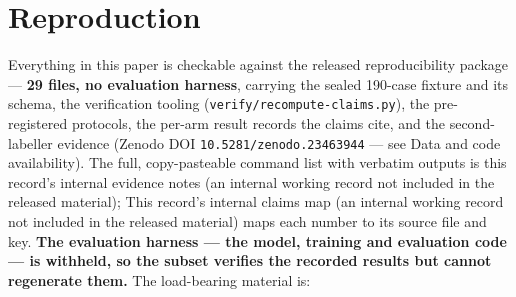 \documentclass[11pt,a4paper]{article}
\begin{document}
\section{Reproduction}

Everything in this paper is checkable against the released reproducibility package --- \textbf{29 files, no evaluation harness}, carrying the sealed 190-case fixture and its schema, the verification tooling (\texttt{verify/recompute-claims.py}), the pre-registered protocols, the per-arm result records the claims cite, and the second-labeller evidence (Zenodo DOI \texttt{10.5281/zenodo.23463944} --- see Data and code availability). The full, copy-pasteable command list with verbatim outputs is this record's internal evidence notes (an internal working record not included in the released material); This record's internal claims map (an internal working record not included in the released material) maps each number to its source file and key. \textbf{The evaluation harness --- the model, training and evaluation code --- is withheld, so the subset verifies the recorded results but cannot regenerate them.} The load-bearing material is:
\end{document}
